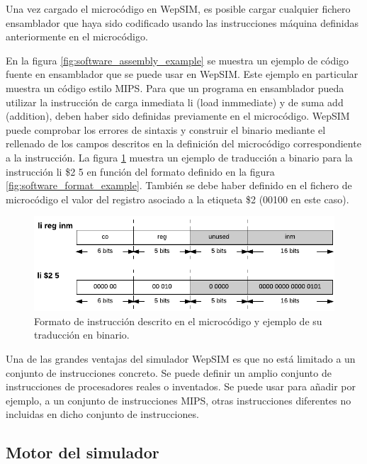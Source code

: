 Una vez cargado el microcódigo en WepSIM, es posible cargar cualquier fichero ensamblador que haya sido codificado usando las instrucciones  máquina definidas anteriormente en el microcódigo.

En la figura \ref{fig:software_assembly_example} se muestra un ejemplo de código fuente en ensamblador que se puede usar en WepSIM. Este ejemplo en particular muestra un código estilo MIPS. Para que un programa en ensamblador pueda utilizar la instrucción de carga inmediata li (load inmmediate) y de suma add (addition), deben haber sido definidas previamente en el microcódigo. WepSIM puede comprobar los errores de sintaxis y construir el binario mediante el rellenado de los campos descritos en la definición del microcódigo correspondiente a la instrucción. La figura \ref{fig:software_assembly_traduction} muestra un ejemplo de traducción a binario para la instrucción li \$2 5 en función del formato definido en la figura \ref{fig:software_format_example}. También se debe haber definido en el fichero de microcódigo el valor del registro asociado a la etiqueta \$2 (00100 en este caso).

\begin{figure}[htbp]
 	\centering
 	\includegraphics[width=14cm]{figures/instruction_example_traduction}
 	\caption{Formato de instrucción descrito en el microcódigo y ejemplo de su traducción en binario.}
	\label{fig:software_assembly_traduction}
\end{figure}

Una de las grandes ventajas del simulador WepSIM es que no está limitado a un conjunto de instrucciones concreto. Se puede definir un amplio conjunto de instrucciones de procesadores reales o inventados. Se puede usar para añadir por ejemplo, a un conjunto de instrucciones MIPS, otras instrucciones diferentes no incluidas en dicho conjunto de instrucciones.

\subsection{Motor del simulador}


